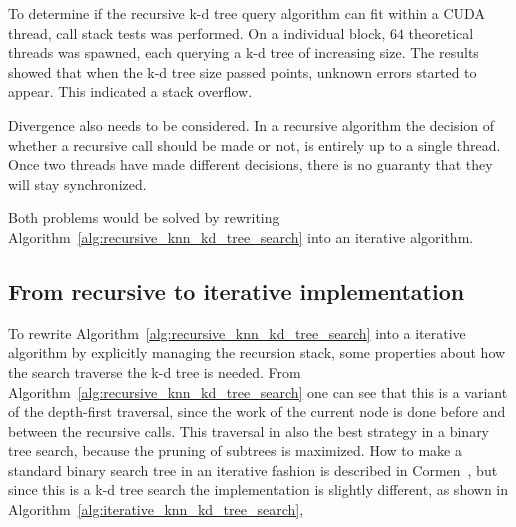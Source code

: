 To determine if the recursive k-d tree query algorithm can fit within a CUDA thread, call stack tests was performed. On a individual block, $64$ theoretical threads was spawned, each querying a k-d tree of increasing size. The results showed that when the k-d tree size passed  points, unknown errors started to appear. This indicated a stack overflow.

Divergence also needs to be considered. In a recursive algorithm the decision of whether a recursive call should be made or not, is entirely up to a single thread. Once two threads have made different decisions, there is no guaranty that they will stay synchronized.

Both problems would be solved by rewriting Algorithm~\ref{alg:recursive_knn_kd_tree_search} into an iterative algorithm.

\subsection{From recursive to iterative implementation} %
\label{sub:from_recursive_to_iterative_implementation}

To rewrite Algorithm~\ref{alg:recursive_knn_kd_tree_search} into a iterative algorithm by explicitly managing the recursion stack, some properties about how the search traverse the k-d tree is needed. From Algorithm~\ref{alg:recursive_knn_kd_tree_search} one can see that this is a variant of the depth-first traversal, since the work of the current node is done before and between the recursive calls. This traversal in also the best strategy in a binary tree search, because the pruning of subtrees is maximized. How to make a standard binary search tree in an iterative fashion is described in Cormen~\citep[Chapter 12]{Cormen:2001}, but since this is a k-d tree search the implementation is slightly different, as shown in Algorithm~\ref{alg:iterative_knn_kd_tree_search},

